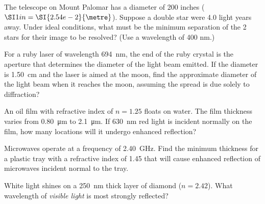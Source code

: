 \documentclass[12pt]{../../ossphysics}
\begin{document}
\begin{questions}
  \question The telescope on Mount Palomar has a diameter of 200 inches
  ($\SI1{in}=\SI{2.54e-2}{\metre}$). Suppose a double star were 4.0 light
  years away. Under ideal conditions, what must be the minimum separation of
  the 2 stars for their image to be resolved? (Use a wavelength of 400 nm.)
  \vspace{\stretch1}
  \newpage
  
  \question For a ruby laser of wavelength \SI{694}{\nano\metre}, the end of
  the ruby crystal is the aperture that determines the diameter of the light
  beam emitted. If the diameter is \SI{1.50}{\centi\metre} and the laser is
  aimed at the moon, find the approximate diameter of the light beam when it
  reaches the moon, assuming the spread is due solely to diffraction?
  \vspace{\stretch1}
  
  
  \question An oil film with refractive index of $n=1.25$ floats on water. The
  film thickness varies from \SI{.80}{\micro\metre} to \SI{2.1}{\micro\metre}.
  If \SI{630}{\nano\metre} red light is incident normally on the film, how many
  locations will it undergo enhanced reflection?
  \vspace{\stretch1}

  \question Microwaves operate at a frequency of \SI{2.40}{\giga\hertz}. Find
  the minimum thickness for a plastic tray with a refractive index of 1.45 that
  will cause enhanced reflection of microwaves incident normal to the tray.
  \vspace{\stretch1}
  \newpage
  
  \question White light shines on a \SI{250}{\nano\metre} thick layer of diamond
  ($n=2.42$). What wavelength of \emph{visible light} is most strongly
  reflected?
  \vspace{\stretch1}
  

\end{questions}
\end{document}
